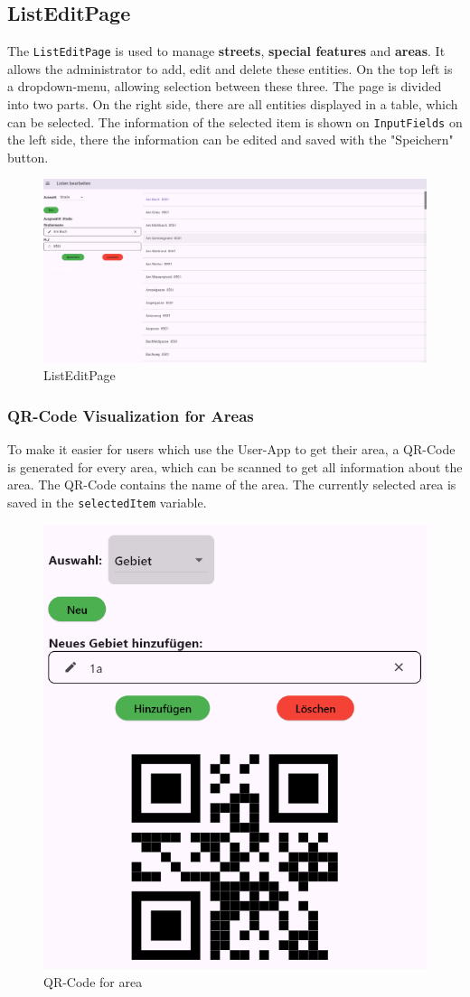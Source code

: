  

\subsection{ListEditPage}
The \texttt{ListEditPage} is used to manage \textbf{streets}, \textbf{special features} and \textbf{areas}. It allows the administrator to add, edit and delete these entities. On the top left is a dropdown-menu, allowing selection between these three. The page is divided into two parts. On the right side, there are all entities displayed in a table, which can be selected. The information of the selected item is shown on \texttt{InputFields} on the left side, there the information can be edited and saved with the "Speichern" button. 

\begin{figure}[H]
    \centering
    \includegraphics[width=0.9\linewidth]{images/AdminPanel/ListEditPage.png}
    \caption{ListEditPage}
\end{figure}

\subsubsection{QR-Code Visualization for Areas}
To make it easier for users which use the User-App to get their area, a QR-Code is generated for every area, which can be scanned to get all information about the area. The QR-Code contains the name of the area. The currently selected area is saved in the \texttt{selectedItem} variable.

\begin{figure}[H]
    \centering
    \includegraphics[width=0.4\linewidth]{images/AdminPanel/QrImageView.png}
    \caption{QR-Code for area}
\end{figure}

